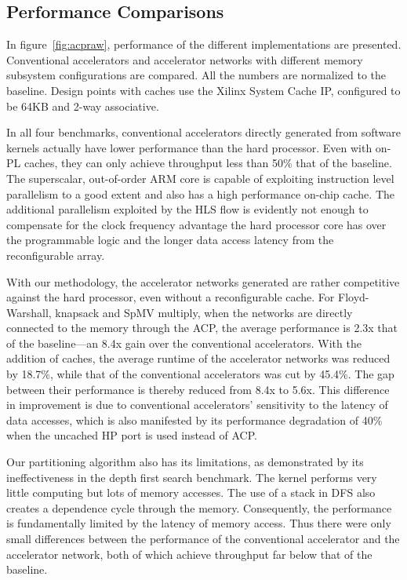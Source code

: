 \documentclass{sig-alternate}
\begin{document}
\subsection{Performance Comparisons}
In figure~\ref{fig:acpraw}, 
performance of the different implementations are presented. 
Conventional accelerators and accelerator networks with different memory subsystem
configurations are compared. All the numbers are normalized to the baseline.
Design points with caches use the Xilinx System Cache IP, configured to be 64KB and 2-way associative.   

In all four benchmarks, conventional accelerators directly generated from software kernels actually have lower performance than the hard processor. Even with
on-PL caches, they can only achieve throughput less than 50\% that of the baseline.
The superscalar, out-of-order ARM core is capable of exploiting instruction level parallelism to a good extent and also has a high performance on-chip cache.
The additional parallelism exploited by the HLS flow is evidently not enough
to compensate for the clock frequency advantage the hard processor core has over the programmable logic and the longer data access latency from the reconfigurable array. 

With our methodology, the accelerator networks generated 
are rather competitive against the hard processor, even
without a reconfigurable cache.  For Floyd-Warshall, knapsack and SpMV multiply, when the networks are directly connected to the memory through the ACP, the average performance is 2.3x that of the baseline---an 8.4x gain over the conventional accelerators. 
With the addition of caches,  
the average runtime of the accelerator networks was reduced by 18.7\%,  while that of the conventional accelerators was cut by 45.4\%. The gap between their performance is thereby reduced from 8.4x to 5.6x. This difference in improvement is due to conventional accelerators' sensitivity to the latency of data accesses, which is also manifested by its performance degradation of 40\% when the uncached HP port is used instead of ACP. 




Our partitioning algorithm also has its limitations, as demonstrated by its ineffectiveness in the depth first search benchmark.
The kernel performs very little computing but lots of memory accesses.
The use of a stack in DFS also creates a dependence cycle through the memory.
Consequently, the performance is fundamentally limited by the latency of memory access.
Thus there were only small differences between the performance of the conventional accelerator and the accelerator network, both of which achieve throughput far below that of the baseline.
\end{document}
